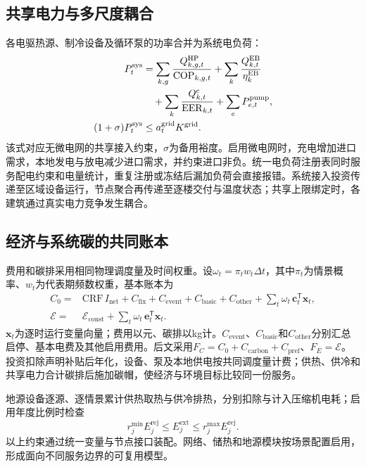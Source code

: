 \subsection{共享电力与多尺度耦合}

各电驱热源、制冷设备及循环泵的功率合并为系统电负荷：
\begin{align}
P_t^{\mathrm{sys}}
&=\sum_{k,g}\frac{Q_{k,g,t}^{\mathrm{HP}}}{\mathrm{COP}_{k,g,t}}
+\sum_k\frac{Q_{k,t}^{\mathrm{EB}}}{\eta_k^{\mathrm{EB}}}
\notag\\
&\quad+\sum_k\frac{Q_{k,t}^{\mathrm c}}{\mathrm{EER}_{k,t}}
+\sum_eP_{e,t}^{\mathrm{pump}},
\notag\\
(1+\sigma)P_t^{\mathrm{sys}}&\leq a_t^{\mathrm{grid}}K^{\mathrm{grid}}.
\label{eq:scoring-electric}
\end{align}
该式对应无微电网的共享接入约束，$\sigma$为备用裕度。启用微电网时，充电增加进口需求，本地发电与放电减少进口需求，并约束进口非负。统一电负荷注册表同时服务配电约束和电量统计，重复注册或冻结后漏加负荷会直接报错。系统接入投资传递至区域设备运行，节点聚合再传递至逐楼交付与温度状态；共享上限绑定时，各建筑通过真实电力竞争发生耦合。

\subsection{经济与系统碳的共同账本}

费用和碳排采用相同物理调度量及时间权重。设$\omega_t=\pi_t w_t\Delta t$，其中$\pi_t$为情景概率、$w_t$为代表期频数权重，基本账本为
\begin{equation}
\begin{aligned}
C_0={}&\mathrm{CRF}\,I_{\mathrm{net}}+C_{\mathrm{fix}}+C_{\mathrm{event}}+C_{\mathrm{basic}}+C_{\mathrm{other}}
+\sum_t\omega_t\,\boldsymbol c_t^\mathsf T\boldsymbol x_t,\\
\mathcal E={}&\mathcal E_{\mathrm{const}}+\sum_t\omega_t\,\boldsymbol e_t^\mathsf T\boldsymbol x_t .
\end{aligned}
\label{eq:scoring-ledger}
\end{equation}
$\boldsymbol x_t$为逐时运行变量向量；费用以元、碳排以kg计。$C_{\mathrm{event}}$、$C_{\mathrm{basic}}$和$C_{\mathrm{other}}$分别汇总启停、基本电费及其他启用费用。后文采用$F_C=C_0+C_{\mathrm{carbon}}+C_{\mathrm{pref}}$、$F_E=\mathcal E$。投资扣除声明补贴后年化，设备、泵及本地供电按共同调度量计费；供热、供冷和共享电力合计碳排后施加碳帽，使经济与环境目标比较同一份服务。

地源设备逐源、逐情景累计供热取热与供冷排热，分别扣除与计入压缩机电耗；启用年度比例时检查
\begin{equation}
r_j^{\min}E_j^{\mathrm{rej}}\leq E_j^{\mathrm{ext}}
\leq r_j^{\max}E_j^{\mathrm{rej}} .
\label{eq:ground-ledger}
\end{equation}
以上约束通过统一变量与节点接口装配。网络、储热和地源模块按场景配置启用，形成面向不同服务边界的可复用模型。
